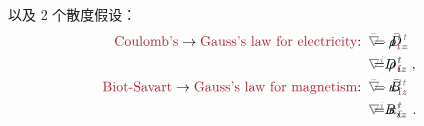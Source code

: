 以及 2 个散度假设：
\begin{subequations} \label{eq:Div-DB}
\begin{align}
	\textcolor{Maroon}{\text{Coulomb's}} \to \textcolor{Maroon}{\text{Gauss's law for electricity}}\text{:}&\hspace{0.5em} \mathcolor{gray}{\bar{\nabla} \cdot} \bar{D}^{\;\!\mathcolor{gray}{t}}_{\;\!\mathcolor{gray}{z}} \hspace{-3.8em} &&= {\rho}^{\;\!\mathcolor{gray}{t}}_{\;\!\textcolor{Maroon}{\text{f}}\mathcolor{gray}{z}} \label{eq:Div-D} \\ 
	&\hspace{0.5em} \mathcolor{gray}{\nabla^i} D^{\;\!\mathcolor{gray}{t}}_{\;\! i\mathcolor{gray}{z}} \hspace{-3.8em} &&= {\rho}^{\;\!\mathcolor{gray}{t}}_{\;\!\textcolor{Maroon}{\text{f}}\mathcolor{gray}{z}}~, \label{eq:div-D} \\
	\textcolor{Maroon}{\text{Biot-Savart}} \to \textcolor{Maroon}{\text{Gauss's law for magnetism}}\text{:}&\hspace{0.5em} \mathcolor{gray}{\bar{\nabla} \cdot} \bar{B}^{\;\!\mathcolor{gray}{t}}_{\;\!\mathcolor{gray}{z}} \hspace{-3.8em} &&= {\kappa}^{\;\!\mathcolor{gray}{t}}_{\;\!\textcolor{Maroon}{\text{f}}\mathcolor{gray}{z}} \label{eq:Div-Bk} \\
	&\hspace{0.5em} \mathcolor{gray}{\nabla^i} B^{\;\!\mathcolor{gray}{t}}_{\;\! i\mathcolor{gray}{z}} \hspace{-3.8em} &&= {\kappa}^{\;\!\mathcolor{gray}{t}}_{\;\!\textcolor{Maroon}{\text{f}}\mathcolor{gray}{z}}~. \label{eq:div-Bk}
\end{align}
\end{subequations}
